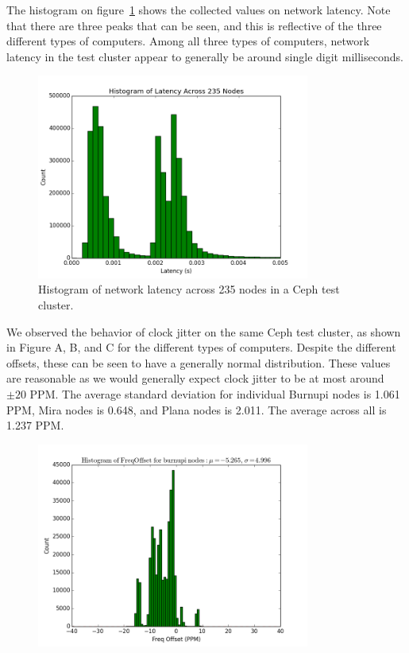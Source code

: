 The histogram on figure~\ref{fig:latency-hist} shows the collected
values on network latency. Note that there are three peaks that can be
seen, and this is reflective of the three different types of
computers. Among all three types of computers, network latency in the
test cluster appear to generally be around single digit milliseconds.

\begin{figure}[h]
  \centering
  \caption{Histogram of network latency across 235 nodes in a Ceph test cluster.} 
  \label{fig:latency-hist}
  \includegraphics[width=0.8\textwidth]{latency-hist.png}
\end{figure}


We observed the behavior of clock jitter on the same Ceph test
cluster, as shown in Figure A, B, and C for the different types of
computers. Despite the different offsets, these can be seen to have a
generally normal distribution. These values are reasonable as we would
generally expect clock jitter to be at most around $\pm 20$ PPM. The average
standard deviation for individual Burnupi nodes is 1.061 PPM, Mira
nodes is 0.648, and Plana nodes is 2.011. The average across all is
1.237 PPM.


\begin{figure}[h]
  \centering
  \includegraphics[width=0.8\textwidth]{burnupi-freq-offset.png}
\end{figure}

